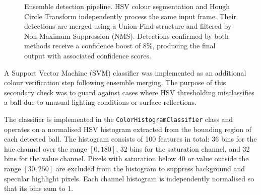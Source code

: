 \begin{figure}[h]
\centering
{}
\caption[Ensemble detection pipeline: HSV and Hough merged via Union-Find and NMS.]{Ensemble detection pipeline. HSV colour segmentation and Hough Circle
Transform independently process the same input frame. Their detections are merged
using a Union-Find structure and filtered by Non-Maximum Suppression (NMS).
Detections confirmed by both methods receive a confidence boost of 8\%, producing
the final output with associated confidence scores.}
\label{fig:ensemble}
\end{figure}


\label{sec:svm}
A Support Vector Machine (SVM) classifier was implemented as an additional colour
verification step following ensemble merging. The purpose of this secondary check
was to guard against cases where HSV thresholding misclassifies a ball due to
unusual lighting conditions or surface reflections.

The classifier is implemented in the \texttt{ColorHistogramClassifier} class and
operates on a normalised HSV histogram extracted from the bounding region of each
detected ball. The histogram consists of 100 features in total: 36 bins for the
hue channel over the range $[0, 180]$, 32 bins for the saturation channel, and
32 bins for the value channel. Pixels with saturation below 40 or value outside
the range $[30, 250]$ are excluded from the histogram to suppress background and
specular highlight pixels. Each channel histogram is independently normalised so
that its bins sum to 1.

